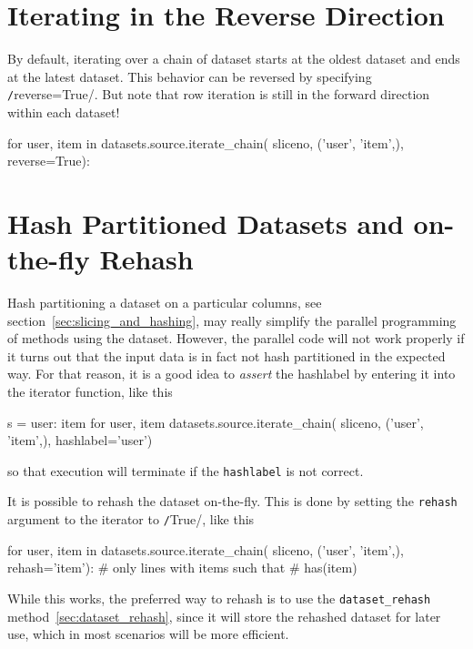 \section{Iterating in the Reverse Direction}
By default, iterating over a chain of dataset starts at the oldest
dataset and ends at the latest dataset.  This behavior can be
reversed by specifying \texttt/reverse=True/.  But note
that row iteration is still in the forward direction within each
dataset!
\begin{python}
for user, item in datasets.source.iterate_chain(
                       sliceno, ('user', 'item',),
                       reverse=True):
\end{python}



\section{Hash Partitioned Datasets and on-the-fly Rehash}
Hash partitioning a dataset on a particular columns, see
section~\ref{sec:slicing_and_hashing}, may really simplify the
parallel programming of methods using the dataset.  However, the
parallel code will not work properly if it turns out that the input
data is in fact not hash partitioned in the expected way.  For that
reason, it is a good idea to \emph{assert} the hashlabel by entering
it into the iterator function, like this
\begin{python}
s = {user: item for user, item datasets.source.iterate_chain(
     sliceno, ('user', 'item',), hashlabel='user')}
\end{python}
so that execution will terminate if the \texttt{hashlabel} is not correct.

It is possible to rehash the dataset on-the-fly.  This is done by
setting the \texttt{rehash} argument to the iterator to
\texttt/True/, like this
\begin{python}
for user, item in datasets.source.iterate_chain(
                       sliceno, ('user', 'item',),
                       rehash='item'):
    # only lines with items such that
    # has(item) %
\end{python}
While this works, the preferred way to rehash is to use the
\texttt{dataset\_rehash} method~\ref{sec:dataset_rehash},
since it will store the rehashed dataset for later use, which in most
scenarios will be more efficient.






